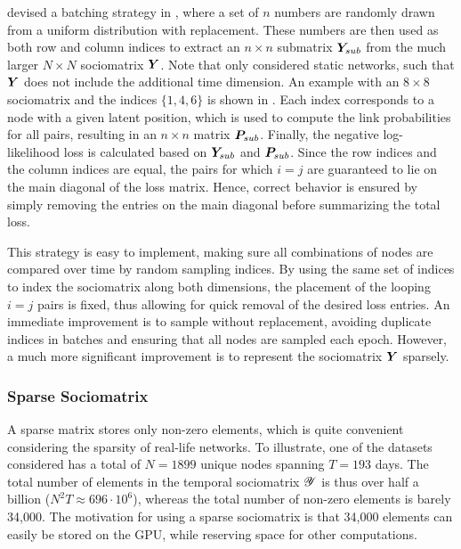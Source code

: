         \citeauthor{jacobsen2018a} devised a batching strategy in \cite{jacobsen2018a}, where a set of $n$ numbers are randomly drawn from a uniform distribution with replacement. These numbers are then used as both row and column indices to extract an $n\times n$ submatrix $\Y_{sub}$ from the much larger $N\times N$ sociomatrix $\Y$. Note that \citeauthor{jacobsen2018a} only considered static networks, such that $\Y$ does not include the additional time dimension.
        An example with an $8\times 8$ sociomatrix and the indices $\{1,4,6\}$ is shown in . Each index corresponds to a node with a given latent position, which is used to compute the link probabilities for all pairs, resulting in an $n\times n$ matrix $\P_{sub}$. Finally, the negative log-likelihood loss is calculated based on $\Y_{sub}$ and $\P_{sub}$. Since the row indices and the column indices are equal, the pairs for which $i=j$ are guaranteed to lie on the main diagonal of the loss matrix. Hence, correct behavior is ensured by simply removing the entries on the main diagonal before summarizing the total loss. 
        
        This strategy is easy to implement, making sure all combinations of nodes are compared over time by random sampling indices. By using the same set of indices to index the sociomatrix along both dimensions, the placement of the looping $i=j$ pairs is fixed, thus allowing for quick removal of the desired loss entries.
        An immediate improvement is to sample without replacement, avoiding duplicate indices in batches and ensuring that all nodes are sampled each epoch. However, a much more significant improvement is to represent the sociomatrix $\Y$ sparsely.
        
    \subsubsection{Sparse Sociomatrix}
    
        A sparse matrix stores only non-zero elements, which is quite convenient considering the sparsity of real-life networks. To illustrate, one of the datasets considered has a total of $N=1899$ unique nodes spanning $T=193$ days. The total number of elements in the temporal sociomatrix $\tY$ is thus over half a billion ($N^2T \approx 696\cdot 10^6$), whereas the total number of non-zero elements is barely 34,000. The motivation for using a sparse sociomatrix is that 34,000 elements can easily be stored on the GPU, while reserving space for other computations.
        
